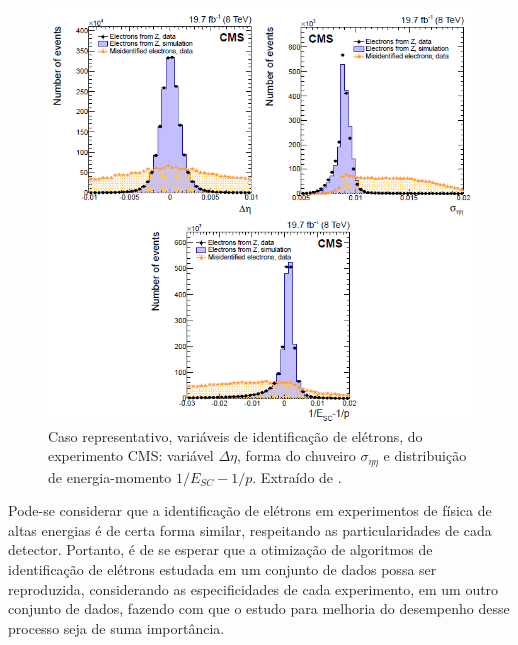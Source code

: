\begin{figure}[!ht]
	\begin{center}
		\includegraphics[width=0.8\linewidth]{./figuras/variaveisCMS.png}
		\caption{Caso representativo, variáveis de identificação de elétrons, do experimento CMS: variável $\Delta\eta$, forma do chuveiro $\sigma_{\eta\eta}$ e distribuição de energia-momento $1/E_{SC}-1/p$. Extraído de \cite{cms2015performance}.}\label{fig:15} 
	\end{center}
\end{figure}

Pode-se considerar que a identificação de elétrons em experimentos de física de altas energias é de certa forma similar, respeitando as particularidades de cada detector. Portanto, é de se esperar que a otimização de algoritmos de identificação de elétrons estudada em um conjunto de dados possa ser reproduzida, considerando as especificidades de cada experimento, em um outro conjunto de dados, fazendo com que o estudo para melhoria do desempenho desse processo seja de suma importância.

